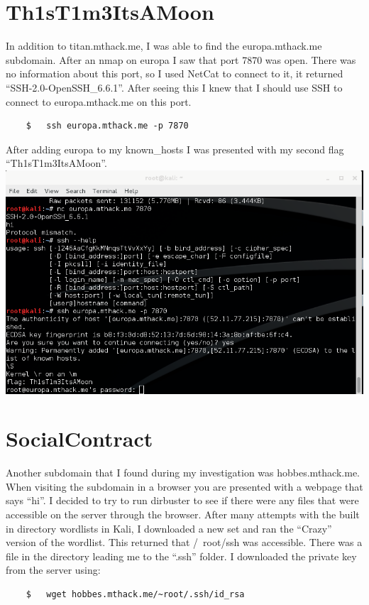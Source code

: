 \documentclass[12pt]{report}
\begin{document}
\section{Th1sT1m3ItsAMoon}
In addition to titan.mthack.me, I was able to find the europa.mthack.me subdomain. After an nmap on europa I saw that port 7870 was open. There was no information about this port, so I used NetCat to connect to it, it returned ``SSH-2.0-OpenSSH\_6.6.1''. After seeing this I knew that I should use SSH to connect to europa.mthack.me on this port.
	\begin{verbatim}
	$	ssh europa.mthack.me -p 7870
	\end{verbatim}
After adding europa to my known\_hosts I was presented with my second flag ``Th1sT1m3ItsAMoon''.\\
\includegraphics[scale=0.33, width=\linewidth]{Th1sT1m3ItsAMoon.png}
\newline
\section{SocialContract}
Another subdomain that I found during my investigation was hobbes.mthack.me. When visiting the subdomain in a browser you are presented with a webpage that says ``hi''. I decided to try to run dirbuster to see if there were any files that were accessible on the server through the browser. After many attempts with the built in directory wordlists in Kali, I downloaded a new set and ran the ``Crazy'' version of the wordlist. This returned that /~root/ssh was accessible. There was a file in the directory leading me to the ``.ssh'' folder. I downloaded the private key from the server using:\\
	\begin{verbatim}
	$	wget hobbes.mthack.me/~root/.ssh/id_rsa
	\end{verbatim}
\end{document}
